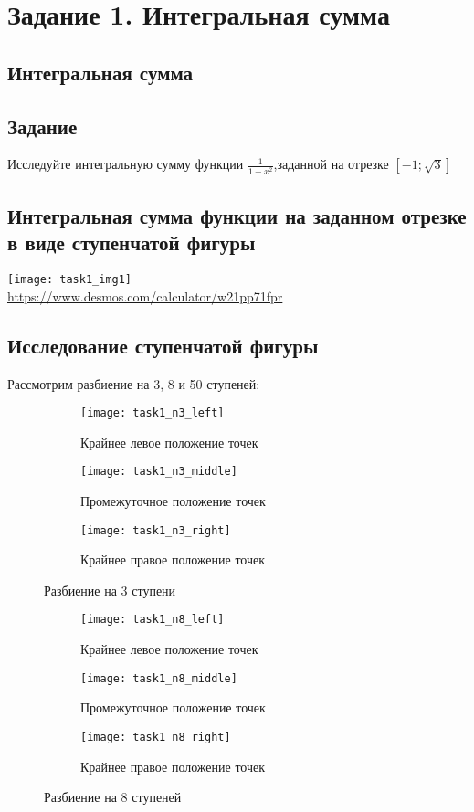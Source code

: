 \section{Задание 1. Интегральная сумма}
\subsection{Интегральная сумма}
\subsection*{Задание}
Исследуйте интегральную сумму функции $ \frac{1}{1 + x^2} $,заданной на отрезке $ \left[-1;\sqrt{3}\right]$
\subsection*{Интегральная сумма функции на заданном отрезке в виде ступенчатой фигуры}
\begin{center}
	\texttt{[image: task1\_img1]}\\
	\url{https://www.desmos.com/calculator/w21pp71fpr}
\end{center}
\subsection*{Исследование ступенчатой фигуры}
Рассмотрим разбиение на 3, 8 и 50 ступеней:
\begin{figure}[H]
	\centering
	\begin{subfigure}{0.3\textwidth}
		\centering
		\texttt{[image: task1\_n3\_left]}\quad
		\caption*{Крайнее левое положение точек}
	\end{subfigure}
	\begin{subfigure}{0.3\textwidth}
		\centering
		\texttt{[image: task1\_n3\_middle]}\quad
		\caption*{Промежуточное положение точек}
	\end{subfigure}
	\begin{subfigure}{0.3\textwidth}
		\centering
		\texttt{[image: task1\_n3\_right]}\quad
		\caption*{Крайнее правое положение точек}
	\end{subfigure}
	\caption{Разбиение на 3 ступени}
\end{figure}

\begin{figure}[H]
	\centering
	\begin{subfigure}{0.3\textwidth}
		\centering
		\texttt{[image: task1\_n8\_left]}\quad
		\caption*{Крайнее левое положение точек}
	\end{subfigure}
	\begin{subfigure}{0.3\textwidth}
		\centering
		\texttt{[image: task1\_n8\_middle]}\quad
		\caption*{Промежуточное положение точек}
	\end{subfigure}
	\begin{subfigure}{0.3\textwidth}
		\centering
		\texttt{[image: task1\_n8\_right]}\quad
		\caption*{Крайнее правое положение точек}
	\end{subfigure}
	\caption{Разбиение на 8 ступеней}
\end{figure}

